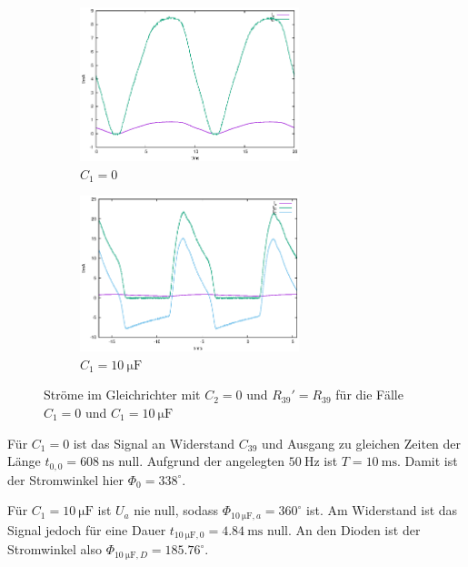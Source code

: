 \documentclass[10pt,a4paper]{scrartcl}
\begin{document}
\begin{figure}[!ht]
    \begin{subfigure}{\textwidth}
        \centering
        \includegraphics[width=0.7\textwidth]
            {graphics/gleichrichter_strom_0F.eps}
        \caption{$C_1=0$}
    \end{subfigure}
    \begin{subfigure}{\textwidth}
        \centering
        \includegraphics[width=0.7\textwidth]
            {graphics/gleichrichter_strom_10uF.eps}
        \caption{$C_1=10~\mathrm{\mu F}$}
    \end{subfigure}
    \caption{Ströme im Gleichrichter mit $C_2=0$ und $R_{39}'=R_{39}$ für
        die Fälle $C_1=0$ und $C_1=10~\mathrm{\mu F}$}
    \label{fig:Gleichrichter_I}
\end{figure}

Für $C_1=0$ ist das Signal an Widerstand $C_{39}$ und Ausgang zu gleichen Zeiten
der Länge $t_{0,0}=608~\mathrm{ns}$ null.
Aufgrund der angelegten $50~\mathrm{Hz}$ ist $T=10~\mathrm{ms}$.
Damit ist der Stromwinkel hier $\Phi_0=338^\circ$.

Für $C_1=10~\mathrm{\mu F}$ ist $U_a$ nie null,
sodass $\Phi_{10~\mathrm{\mu F},a}=360^\circ$ ist.
Am Widerstand ist das Signal jedoch für eine Dauer
$t_{10~\mathrm{\mu F},0}=4.84~\mathrm{ms}$ null.
An den Dioden ist der Stromwinkel also
$\Phi_{10~\mathrm{\mu F},D}=185.76^\circ$.
\end{document}
